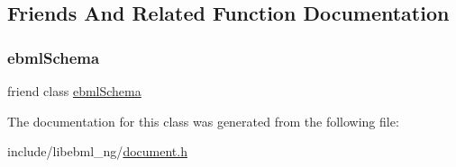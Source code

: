\subsection{Friends And Related Function Documentation}
\mbox{\label{classebml_1_1ebmlDocument_ab99d947c503dbe1ab7ebb0a75c24e4df}} 
\subsubsection{\texorpdfstring{ebml\+Schema}{ebmlSchema}}
{\footnotesize\ttfamily friend class \mbox{\hyperlink{classebml_1_1ebmlSchema}{ebml\+Schema}}\hspace{0.3cm}{\ttfamily [friend]}}



The documentation for this class was generated from the following file\+:\begin{DoxyCompactItemize}
\item 
include/libebml\+\_\+ng/\mbox{\hyperlink{document_8h}{document.\+h}}\end{DoxyCompactItemize}
